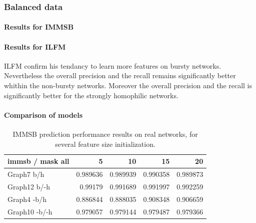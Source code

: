 \subsubsection{Balanced data}
\paragraph{Results for IMMSB}

\paragraph{Results for ILFM}
ILFM confirm his tendancy to learn more features on bursty networks. Nevertheless the overall precision and the recall remains significantly better whithin the non-bursty networks. Moreover the overall precision and the recall is significantly better for the strongly homophilic networks.

\paragraph{Comparison of models}

\begin{table} \label{table:real1}
    \caption{IMMSB prediction performance results on real networks, for several feature size initialization.}
\begin{tabular}{lrrrr}
\hline                                                                             
 immsb / mask all   &        5 &       10 &       15 &       20 \\                 
\hline                                                                             
 Graph7 b/h         & 0.989636 & 0.989939 & 0.990358 & 0.989873 \\                 
 Graph12 b/-h       & 0.99179  & 0.991689 & 0.991997 & 0.992259 \\                 
 Graph4 -b/h        & 0.886844 & 0.888035 & 0.908348 & 0.906659 \\                 
 Graph10 -b/-h      & 0.979057 & 0.979144 & 0.979487 & 0.979366 \\                 
\hline                                                                             
\end{tabular}  
\end{table}

 

